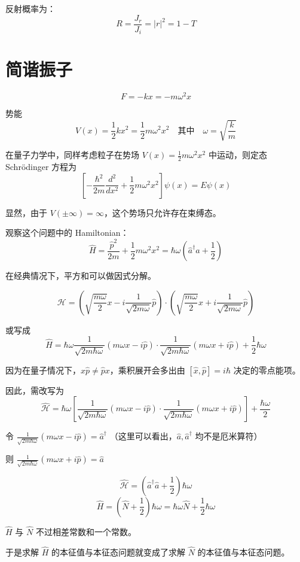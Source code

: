 \documentclass[lang=cn,10pt]{elegantbook}
\begin{document}
反射概率为：
\[
R = \frac{J_r}{J_i} = |r|^2 = 1 - T
\]
\section{简谐振子}
\[
F = -kx = -m\omega^2 x
\]

势能
\[
V(x) = \frac{1}{2}kx^2 = \frac{1}{2}m\omega^2 x^2 \quad \text{其中} \quad \omega = \sqrt{\frac{k}{m}}
\]

在量子力学中，同样考虑粒子在势场 \( V(x) = \frac{1}{2}m\omega^2 x^2 \) 中运动，则定态 Schrödinger 方程为
\[
\left[ -\frac{\hbar^2}{2m} \frac{d^2}{dx^2} + \frac{1}{2}m\omega^2 x^2 \right] \psi(x) = E \psi(x)
\]

显然，由于 \( V(\pm\infty) = \infty \)，这个势场只允许存在束缚态。

观察这个问题中的 Hamiltonian：
\[
\hat{H} = \frac{\hat{p}^2}{2m} + \frac{1}{2}m\omega^2 x^2 = \hbar\omega \left( \hat{a}^\dagger \hat{a} + \frac{1}{2} \right)
\]

在经典情况下，平方和可以做因式分解。

\[
\mathcal{H} = \left( \sqrt{\frac{m\omega}{2}} x - i \frac{1}{\sqrt{2m\omega}} \hat{p} \right) \cdot \left( \sqrt{\frac{m\omega}{2}} x + i \frac{1}{\sqrt{2m\omega}} \hat{p} \right)
\]

或写成
\[
\hat{H} = \hbar \omega \frac{1}{\sqrt{2m\hbar\omega}} (m \omega x - i \hat{p}) \cdot \frac{1}{\sqrt{2m\hbar\omega}} (m \omega x + i \hat{p}) + \frac{1}{2} \hbar \omega
\]

因为在量子情况下，\(x\hat{p}\neq \hat{p}x\)，乘积展开会多出由 \([\hat{x},\hat{p}]=i\hbar\) 决定的零点能项。

因此，需改写为
\[
\hat{\mathcal{H}} = \hbar \omega \left[ \frac{1}{\sqrt{2m\hbar\omega}} (m \omega x - i \hat{p}) \cdot \frac{1}{\sqrt{2m\hbar\omega}} (m \omega x + i \hat{p}) \right] + \frac{\hbar \omega}{2}
\]

令 \(\frac{1}{\sqrt{2m\hbar\omega}} (m \omega x - i \hat{p}) = \hat{a}^\dagger\) （这里可以看出，\(\hat{a}, \hat{a}^\dagger\) 均不是厄米算符）

则 \(\frac{1}{\sqrt{2m\hbar\omega}} (m \omega x + i \hat{p}) = \hat{a}\)

\[
\hat{\mathcal{H}} = (\hat{a}^\dagger \hat{a} + \frac{1}{2}) \hbar \omega
\]
\[
\hat{H} = \left( \hat{N} + \frac{1}{2} \right) \hbar \omega = \hbar \omega \hat{N} + \frac{1}{2} \hbar \omega
\]

\(\hat{H}\) 与 \(\hat{N}\) 不过相差常数和一个常数。

于是求解 \(\hat{H}\) 的本征值与本征态问题就变成了求解 \(\hat{N}\) 的本征值与本征态问题。
\end{document}
